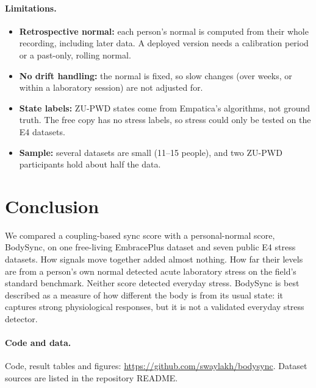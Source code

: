\documentclass{article}
\begin{document}
\paragraph{Limitations.}
\begin{itemize}
\item \textbf{Retrospective normal:} each person's normal is computed from their whole recording, including later data. A deployed version needs a calibration period or a past-only, rolling normal.
\item \textbf{No drift handling:} the normal is fixed, so slow changes (over weeks, or within a laboratory session) are not adjusted for.
\item \textbf{State labels:} ZU-PWD states come from Empatica's algorithms, not ground truth. The free copy has no stress labels, so stress could only be tested on the E4 datasets.
\item \textbf{Sample:} several datasets are small (11--15 people), and two ZU-PWD participants hold about half the data.
\end{itemize}

\section{Conclusion}

We compared a coupling-based sync score with a personal-normal score, BodySync, on one free-living EmbracePlus dataset and seven public E4 stress datasets. How signals move together added almost nothing. How far their levels are from a person's own normal detected acute laboratory stress on the field's standard benchmark. Neither score detected everyday stress. BodySync is best described as a measure of how different the body is from its usual state: it captures strong physiological responses, but it is not a validated everyday stress detector.

\paragraph{Code and data.} Code, result tables and figures: \url{https://github.com/swaylakh/bodysync}. Dataset sources are listed in the repository README.
\end{document}
